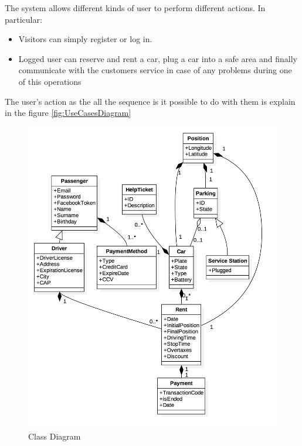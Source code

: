 The system allows different kinds of user to perform different actions. In particular:
\begin{itemize}
	\item Visitors can simply register or log in.
	\item Logged user can reserve and rent a car, plug a car into a safe area and finally communicate with the customers service in case of any problems during one of this operations
\end{itemize}
The user's action as the all the sequence is it possible to do with them is explain in the figure \ref{fig:UseCasesDiagram}
\begin{figure}[h]
   \begin{center}
    \includegraphics[width=\textwidth]{Resources/UML.png}
    \caption{Class Diagram}
   \end{center}
    \label{fig:ClassDiagram}
\end{figure}